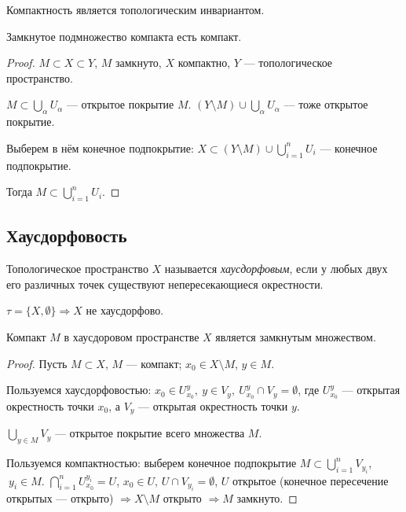 \begin{remark}
    Компактность является топологическим инвариантом.
\end{remark}

\begin{statement}
    Замкнутое подмножество компакта есть компакт.
\end{statement}
\begin{proof}
    $M \subset X \subset Y$, $M$ замкнуто, $X$ компактно, $Y$ — топологическое пространство.

    $M \subset \bigcup\limits_{\alpha} U_{\alpha}$ — открытое покрытие $M$.
    $(Y \setminus M) \cup \bigcup\limits_{\alpha} U_{\alpha}$ — тоже открытое покрытие.

    Выберем в нём конечное подпокрытие:
    $X \subset (Y \setminus M) \cup \bigcup\limits_{i = 1}^n U_i$ — конечное подпокрытие.

    Тогда $M \subset \bigcup\limits_{i = 1}^n U_i$.
\end{proof}


\subsection{Хаусдорфовость}
\begin{definition}
    Топологическое пространство $X$ называется \textit{хаусдорфовым}, если у любых двух его различных точек существуют непересекающиеся окрестности.
\end{definition}

$\tau = \{X, \emptyset\} \Longrightarrow X$ не хаусдорфово.

\begin{lemma}
    Компакт $M$ в хаусдоровом пространстве $X$ является замкнутым множеством.
\end{lemma}
\begin{proof}
    Пусть $M \subset X$, $M$ — компакт;
    $x_0 \in X \setminus M$, $y \in M$.

    Пользуемся хаусдорфовостью: $x_0 \in U_{x_0}^y, \ y \in V_y, \ U_{x_0}^y \cap V_y = \emptyset$, где $U_{x_0}^y$ — открытая окрестность точки $x_0$, а $V_y$ — открытая окрестность точки $y$.

    $\bigcup_{y \in M} V_y$ — открытое покрытие всего множества $M$.

    Пользуемся компактностью: выберем конечное подпокрытие $M \subset \bigcup_{i = 1}^n V_{y_i}$, $\ y_i \in M$.
    $\bigcap_{i = 1}^n U_{x_0}^{y_i} = U$, $x_0 \in U$, $U \cap V_{y_i} = \emptyset$, $U$ открытое (конечное пересечение открытых — открыто) $\Longrightarrow X \setminus M$ открыто $\Longrightarrow M$ замкнуто.
\end{proof}

